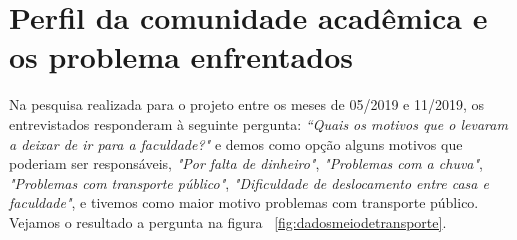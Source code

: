 \section{Perfil da comunidade acadêmica e os problema enfrentados}

Na pesquisa realizada para o projeto entre os meses de 05/2019 e 11/2019, os entrevistados responderam à seguinte pergunta: \textit{“Quais os motivos que o levaram a deixar de ir para a faculdade?"} e demos como opção alguns motivos que poderiam ser responsáveis, \textit{"Por falta de dinheiro"}, \textit{"Problemas com a chuva"}, \textit{"Problemas com transporte público"}, \textit{"Dificuldade de deslocamento entre casa e faculdade"}, e tivemos como maior motivo problemas com transporte público. Vejamos o resultado a pergunta na figura ~\ref{fig:dadosmeiodetransporte}.





